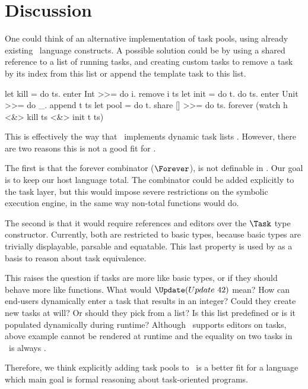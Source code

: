 
\section{Discussion}
\label{sec:discussion}


One could think of an alternative implementation of task pools,
using already existing \TOPHAT\ language constructs.
A possible solution could be by using a shared reference to a list of running tasks,
and creating custom tasks to remove a task by its index from this list
or append the template task to this list.
\begin{TASK}
  let kill = do ts. enter Int >>= do i. remove i ts
  let init = do t. do ts. enter Unit >>= do _. append t ts
  let pool = do t.
    share [] >>= do ts.
    forever (watch h <&> kill ts <&> init t ts)
\end{TASK}

This is effectively the way that \ITASKS\ implements dynamic task lists \cite{conf/pepm/PlasmeijerAKLNG11}.
However, there are two reasons this is not a good fit for \TOPHAT.

The first is that the forever combinator ($\Forever$), is not definable in \TOPHAT.
Our goal is to keep our host language total.
The combinator could be added explicitly to the task layer,
but this would impose severe restrictions on the symbolic execution engine,
in the same way non-total functions would do.

The second is that it would require references and editors over the $\Task$ type constructor.
Currently, both are restricted to basic types,
because basic types are trivially displayable, parsable and equatable.
This last property is used by \cite{Klijnsma2020} as a basis to reason about task equivalence.

This raises the question if tasks are more like basic types, or if they should behave more like functions.
What would $\Update (Update\ 42)$ mean?
How can end-users dynamically enter a task that results in an integer?
Could they create new tasks at will?
Or should they pick from a list?
Is this list predefined or is it populated dynamically during runtime?
Although \ITASKS\ supports editors on tasks,
above example cannot be rendered at runtime and the equality on two tasks in \ITASKS\ is always .

Therefore, we think explicitly adding task pools to \TOPHAT\ is a better fit for a language which main goal is formal reasoning about task-oriented programs.
